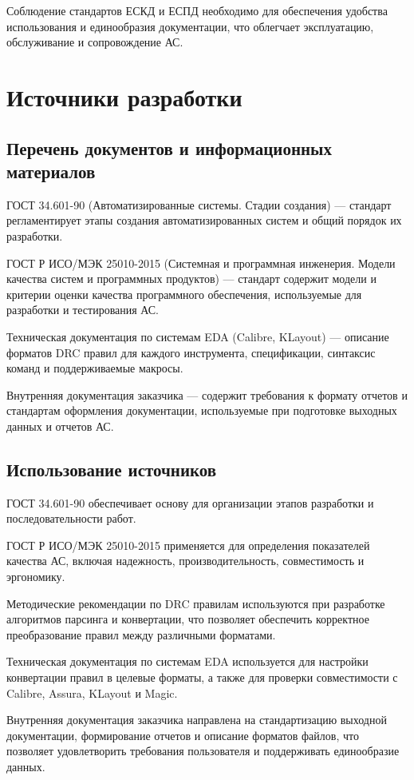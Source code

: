 Соблюдение стандартов ЕСКД и ЕСПД необходимо
для обеспечения удобства использования и единообразия документации,
что облегчает эксплуатацию, обслуживание и сопровождение АС.

\section{Источники разработки}

\subsection{Перечень документов и информационных материалов}

ГОСТ 34.601-90 (Автоматизированные системы. Стадии создания)
--- стандарт регламентирует этапы создания автоматизированных систем
и общий порядок их разработки.

ГОСТ Р ИСО/МЭК 25010-2015 (Системная и программная инженерия.
Модели качества систем и программных продуктов) --- стандарт содержит модели
и критерии оценки качества программного обеспечения,
используемые для разработки и тестирования АС.

Техническая документация по системам EDA (Calibre, KLayout)
--- описание форматов DRC правил для каждого инструмента,
спецификации, синтаксис команд и поддерживаемые макросы.

Внутренняя документация заказчика --- содержит требования к формату отчетов
и стандартам оформления документации,
используемые при подготовке выходных данных и отчетов АС.

\subsection{Использование источников}

ГОСТ 34.601-90 обеспечивает основу для организации этапов разработки
и последовательности работ.

ГОСТ Р ИСО/МЭК 25010-2015 применяется
для определения показателей качества АС, включая надежность,
производительность, совместимость и эргономику.

Методические рекомендации по DRC правилам используются
при разработке алгоритмов парсинга и конвертации,
что позволяет обеспечить корректное преобразование правил
между различными форматами.

Техническая документация по системам EDA используется
для настройки конвертации правил в целевые форматы,
а также для проверки совместимости с Calibre, Assura, KLayout и Magic.

Внутренняя документация заказчика направлена
на стандартизацию выходной документации,
формирование отчетов и описание форматов файлов,
что позволяет удовлетворить требования пользователя
и поддерживать единообразие данных.


